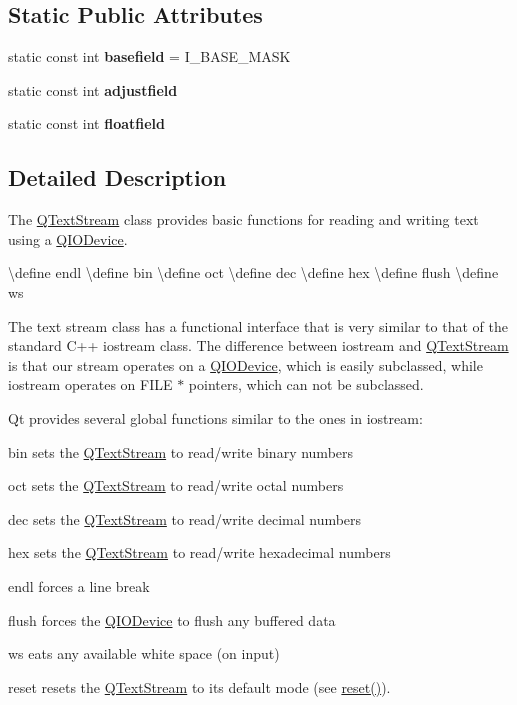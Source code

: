 \subsection*{Static Public Attributes}
\begin{DoxyCompactItemize}
\item 
\mbox{\label{class_q_text_stream_af3f86710e9a559feb59d4b5e08017bed}} 
static const int {\bfseries basefield} = I\+\_\+\+B\+A\+S\+E\+\_\+\+M\+A\+SK
\item 
static const int {\bfseries adjustfield}
\item 
static const int {\bfseries floatfield}
\end{DoxyCompactItemize}


\subsection{Detailed Description}
The \mbox{\hyperlink{class_q_text_stream}{Q\+Text\+Stream}} class provides basic functions for reading and writing text using a \mbox{\hyperlink{class_q_i_o_device}{Q\+I\+O\+Device}}. 

\textbackslash{}define endl \textbackslash{}define bin \textbackslash{}define oct \textbackslash{}define dec \textbackslash{}define hex \textbackslash{}define flush \textbackslash{}define ws

The text stream class has a functional interface that is very similar to that of the standard C++ iostream class. The difference between iostream and \mbox{\hyperlink{class_q_text_stream}{Q\+Text\+Stream}} is that our stream operates on a \mbox{\hyperlink{class_q_i_o_device}{Q\+I\+O\+Device}}, which is easily subclassed, while iostream operates on F\+I\+LE $\ast$ pointers, which can not be subclassed.

Qt provides several global functions similar to the ones in iostream\+: 
\begin{DoxyItemize}
\item {\ttfamily bin} sets the \mbox{\hyperlink{class_q_text_stream}{Q\+Text\+Stream}} to read/write binary numbers 
\item {\ttfamily oct} sets the \mbox{\hyperlink{class_q_text_stream}{Q\+Text\+Stream}} to read/write octal numbers 
\item {\ttfamily dec} sets the \mbox{\hyperlink{class_q_text_stream}{Q\+Text\+Stream}} to read/write decimal numbers 
\item {\ttfamily hex} sets the \mbox{\hyperlink{class_q_text_stream}{Q\+Text\+Stream}} to read/write hexadecimal numbers 
\item {\ttfamily endl} forces a line break 
\item {\ttfamily flush} forces the \mbox{\hyperlink{class_q_i_o_device}{Q\+I\+O\+Device}} to flush any buffered data 
\item {\ttfamily ws} eats any available white space (on input) 
\item {\ttfamily reset} resets the \mbox{\hyperlink{class_q_text_stream}{Q\+Text\+Stream}} to its default mode (see \mbox{\hyperlink{class_q_text_stream_ac92d855fc3fa8b5d1c7421e2a0654a83}{reset()}}). 
\end{DoxyItemize}

